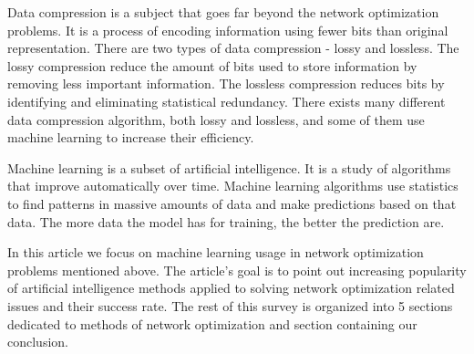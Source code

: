 \documentclass[conference]{IEEEtran}
\begin{document}
Data compression is a subject that goes far beyond the network optimization problems. It is a process of encoding information using fewer bits than original representation. There are two types of data compression - lossy and lossless. The lossy compression reduce the amount of bits used to store information by removing less important information. The lossless compression reduces bits by identifying and eliminating statistical redundancy. There exists many different data compression algorithm, both lossy and lossless, and some of them use machine learning to increase their efficiency\cite{compression1}\cite{compression2}.\par
Machine learning is a subset of artificial intelligence. It is a study of algorithms that improve automatically over time. Machine learning algorithms use statistics to find patterns in massive amounts of data and make predictions based on that data. The more data the model has for training, the better the prediction are.\par
In this article we focus on machine learning usage in network optimization problems mentioned above. The article's goal is to point out increasing popularity of artificial intelligence methods applied to solving network optimization related issues and their success rate. The rest of this survey is organized into 5 sections dedicated to methods of network optimization and section containing our conclusion.\par


%
%
\end{document}
